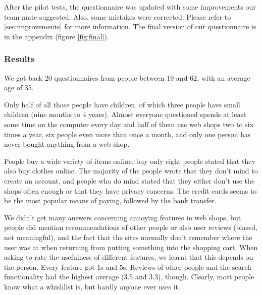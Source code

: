 After the pilot tests, the questionnaire was updated with some improvements our team mate suggested. Also, some mistakes were corrected. Please refer to \ref{sec:improvements} for more information.
The final version of our questionnaire is in the appendix (figure \ref{fig:final}).

\subsubsection{Results}
We got back 20 questionnaires from people between 19 and 62, with an average age of 35. 

Only half of all those people have children, of which three people have small children (nine months to 4 years). Almost everyone questioned spends at least some time on the computer every day and half of them use web shops two to six times a year, six people even more than once a month, and only one person has never bought anything from a web shop.

People buy a wide variety of items online, buy only eight people stated that they also buy clothes online. The majority of the people wrote that they don't mind to create an account, and people who do mind stated that they either don't use the shops often enough or that they have privacy concerns.
The credit cards seems to be the most popular means of paying, followed by the bank transfer.

We didn't get many answers concerning annoying features in web shops, but people did mention recommendations of other people or also user reviews (biased, not meaningful), and the fact that the sites normally don't remember where the user was at when returning from putting something into the shopping cart. When asking to rate the usefulness of different features, we learnt that this depends on the person. Every feature got 1s and 5s. Reviews of other people and the search functionality had the highest average (3.5 and 3.3), though. Clearly, most people know what a whishlist is, but hardly anyone ever uses it.

